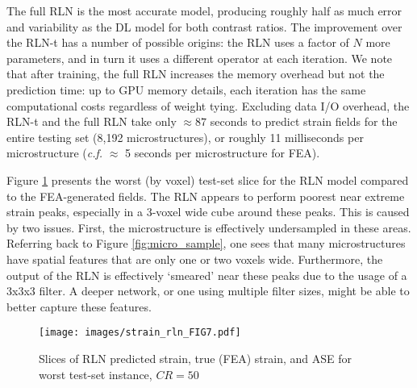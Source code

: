 \documentclass[3p, preprint]{elsarticle}
\newenvironment{revision} {} {}
\begin{document}
The full RLN is the most accurate model, producing roughly half as much error and variability as the DL model for both contrast ratios. \begin{revision}
The improvement over the RLN-t has a number of possible origins: the RLN uses a factor of $N$ more parameters, and in turn it uses a different operator at each iteration. We note that after training, the full RLN increases the memory overhead but not the prediction time: up to GPU memory details, each iteration has the same computational costs regardless of weight tying. Excluding data I/O overhead, the RLN-t and the full RLN take only\end{revision} $\approx 87$ seconds to predict strain fields for the entire testing set (8,192 microstructures), or roughly 11 milliseconds per microstructure (\textit{c.f.} $\approx$ 5 seconds per microstructure for FEA).

Figure \ref{fig:strain_rln} presents the worst (by voxel) test-set slice for the RLN model compared to the FEA-generated fields. The RLN appears to perform poorest near extreme strain peaks, especially in a 3-voxel wide cube around these peaks. This is caused by two issues. First, the microstructure is effectively undersampled in these areas. Referring back to Figure \ref{fig:micro_sample}, one sees that many microstructures have spatial features that are only one or two voxels wide. Furthermore, the output of the RLN is effectively `smeared' near these peaks due to the usage of a 3x3x3 filter. A deeper network, or one using multiple filter sizes, might be able to better capture these features. 

\begin{figure}
    \centering
    \texttt{[image: images/strain\_rln\_FIG7.pdf]}
    \caption{Slices of RLN predicted strain, true (FEA) strain, and ASE for worst test-set instance, $CR=50$}
    \label{fig:strain_rln}
\end{figure}
\end{document}
